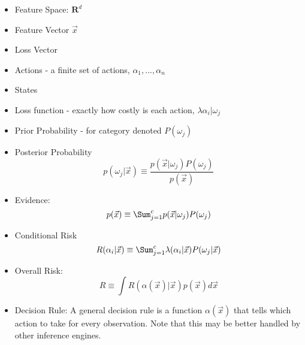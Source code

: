 

\begin{itemize}
	\item Feature Space:  $\mathbf{R}^d$
	\item Feature Vector $\vec{x}$
	\item Loss Vector 
	\item Actions - a finite set of actions, $\alpha_1, ..., \alpha_n$
	\item States
	\item Loss function - exactly how costly is each action, $\lambda{\alpha_i | \omega_j}$
	\item Prior Probability - for category denoted $P(\omega_j)$
	\item Posterior Probability 
	\[
	p(\omega_j | \vec{x}) \equiv \frac{p( \vec{x} | \omega_j) P(\omega_j)}{p(\vec{x})}
	\]
	\item Evidence:  
	\[ 
	p(\vec{x}) \equiv \Sum_{j=1} ^c p ( \vec{x} | \omega_j) P (\omega_j)
	\]
	\item Conditional Risk 
	\[
		R ( \alpha_i | \vec{x}) \equiv \Sum _{j=1} ^c \lambda(\alpha _ i | \vec{x} ) P(\omega_j | \vec{x})
	\]
	\item Overall Risk: 
	\[
		R \equiv \int R (\alpha (\vec{x}) | \vec{x}) p( \vec{x}) d\vec{x}
	\]
	\item Decision Rule: A general decision rule is a function $\alpha (\vec{x})$ that tells which action to take for every observation.  Note that this may be better handled by other inference engines.  
\end{itemize}



